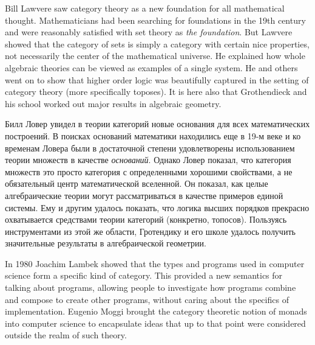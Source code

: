 \documentclass[CT4S-EN-RU]{subfiles}
\begin{document}
\begin{blockENG}
Bill Lawvere saw category theory as a new foundation for all mathematical thought. Mathematicians had been searching for foundations in the 19th century and were reasonably satisfied with set theory as {\em the foundation}. But Lawvere showed that the category of sets is simply a category with certain nice properties, not necessarily the center of the mathematical universe. He explained how whole algebraic theories can be viewed as examples of a single system. He and others went on to show that higher order logic was beautifully captured in the setting of category theory (more specifically toposes). It is here also that Grothendieck and his school worked out major results in algebraic geometry.
\end{blockENG}

\begin{blockRUS}
Билл Ловер увидел в теории категорий новые основания для всех математических построений. В поисках оснований математики находились еще в 19-м веке и ко временам Ловера были в достаточной степени удовлетворены использованием теории множеств в качестве {\em оснований}.%
 Однако Ловер показал, что категория множеств это просто категория с определенными хорошими свойствами, а не обязательный центр математической вселенной. Он показал, как целые алгебраические теории могут рассматриваться в качестве примеров единой системы. Ему и другим удалось показать, что логика высших порядков прекрасно охватывается средствами теории категорий (конкретно, топосов). Пользуясь инструментами из этой же области, Гротендику и его школе удалось получить значительные результаты в алгебраической геометрии. 
\end{blockRUS}

\begin{blockENG}
In 1980 Joachim Lambek showed that the types and programs used in computer science form a specific kind of category. This provided a new semantics for talking about programs, allowing people to investigate how programs combine and compose to create other programs, without caring about the specifics of implementation. Eugenio Moggi brought the category theoretic notion of monads into computer science to encapsulate ideas that up to that point were considered outside the realm of such theory.
\end{blockENG}
\end{document}
